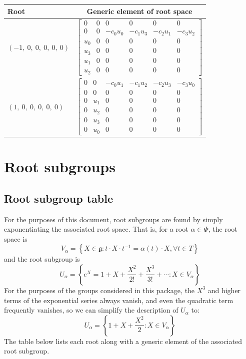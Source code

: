 \documentclass[11pt]{article}
\newcommand{\noi}{\noindent}
\newcommand{\inv}{^{-1}}
\newcommand{\lb}{\left\{}
\newcommand{\rb}{\right\}}
\newcommand{\frakg}{\mathfrak{g}}
\theoremstyle{definition}
\begin{document}
\noindent \begin{longtable}{|l|c|}
    \hline
    \textbf{Root} & \textbf{Generic element of root space} \\
    \hline
    \endhead
    $\left( -1, \  0, \  0, \  0, \  0, \  0\right)$ & ${\left[\begin{matrix}0 & 0 & 0 & 0 & 0 & 0\\0 & 0 & - c_{0} u_{0} & - c_{1} u_{3} & - c_{2} u_{1} & - c_{3} u_{2}\\u_{0} & 0 & 0 & 0 & 0 & 0\\u_{3} & 0 & 0 & 0 & 0 & 0\\u_{1} & 0 & 0 & 0 & 0 & 0\\u_{2} & 0 & 0 & 0 & 0 & 0\end{matrix}\right]}$ \\
    \hline
    $\left( 1, \  0, \  0, \  0, \  0, \  0\right)$ & ${\left[\begin{matrix}0 & 0 & - c_{0} u_{1} & - c_{1} u_{2} & - c_{2} u_{3} & - c_{3} u_{0}\\0 & 0 & 0 & 0 & 0 & 0\\0 & u_{1} & 0 & 0 & 0 & 0\\0 & u_{2} & 0 & 0 & 0 & 0\\0 & u_{3} & 0 & 0 & 0 & 0\\0 & u_{0} & 0 & 0 & 0 & 0\end{matrix}\right]}$ \\
    \hline
\end{longtable}


\newpage
\section{Root subgroups}

\subsection{Root subgroup table}

\noi For the purposes of this document, root subgroups are found by simply exponentiating the associated root space. That is, for a root $\alpha \in \Phi$, the root space is
\[
	V_\alpha = \lb X \in \frakg : t \cdot X \cdot t \inv = \alpha(t) \cdot X, \forall t \in T \rb
\]
and the root subgroup is
\[
	U_\alpha = \lb e^X = 1 + X + \frac{X^2}{2!} + \frac{X^3}{3!} + \cdots : X \in V_\alpha \rb
\]
For the purposes of the groups considered in this package, the $X^3$ and higher terms of the exponential series always vanish, and even the quadratic term frequently vanishes, so we can simplify the description of $U_\alpha$ to:
\[
	U_\alpha = \lb 1 + X + \frac{X^2}{2} : X \in V_\alpha \rb
\]
The table below lists each root along with a generic element of the associated root subgroup.
\end{document}
